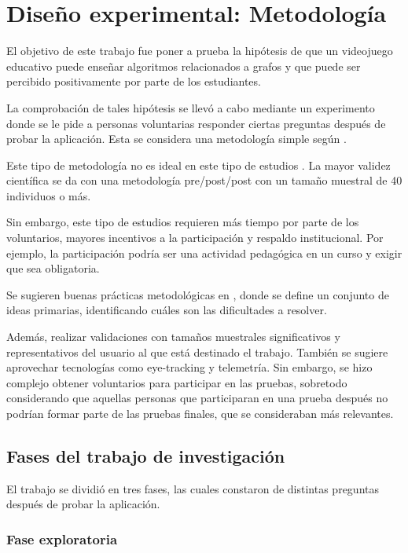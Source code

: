 \chapter{Diseño experimental: Metodología}

El objetivo de este trabajo fue poner a prueba la hipótesis de que un videojuego educativo puede enseñar algoritmos relacionados a grafos y que puede ser percibido positivamente por parte de los estudiantes.

La comprobación de tales hipótesis se llevó a cabo mediante un experimento donde se le pide a personas voluntarias responder ciertas preguntas después de probar la aplicación. Esta se considera una metodología simple según \cite{HowGamesComputingEducationEvaluated}. 

Este tipo de metodología no es ideal en este tipo de estudios \cite{HowGamesComputingEducationEvaluated}. La mayor validez científica se da con una metodología pre/post/post con un tamaño muestral de 40 individuos o más. 

Sin embargo, este tipo de estudios requieren más tiempo por parte de los voluntarios, mayores incentivos a la participación y respaldo institucional. Por ejemplo, la participación podría ser una actividad pedagógica en un curso y exigir que sea obligatoria.

Se sugieren buenas prácticas metodológicas en \cite{Rogers2002InteractionDesign, MeegaPlusManual, HowGamesComputingEducationEvaluated}, donde se define un conjunto de ideas primarias, identificando cuáles son las dificultades a resolver. 

Además, realizar validaciones con tamaños muestrales significativos y representativos del usuario al que está destinado el trabajo. También se sugiere aprovechar tecnologías como eye-tracking y telemetría. Sin embargo, se hizo complejo obtener voluntarios para participar en las pruebas, sobretodo considerando que aquellas personas que participaran en una prueba después no podrían formar parte de las pruebas finales, que se consideraban más relevantes.


\section{Fases del trabajo de investigación}

El trabajo se dividió en tres fases, las cuales constaron de distintas preguntas después de probar la aplicación.

\subsection{Fase exploratoria}

